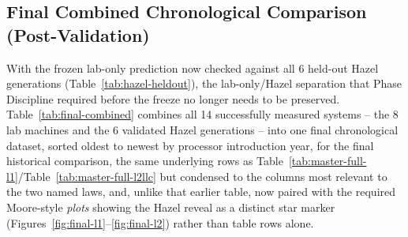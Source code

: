 \documentclass{article}
\begin{document}
\subsection{Final Combined Chronological Comparison (Post-Validation)}
\label{sec:final-combined}

With the frozen lab-only prediction now checked against all 6 held-out Hazel generations
(Table~\ref{tab:hazel-heldout}), the lab-only/Hazel separation that Phase Discipline required
before the freeze no longer needs to be preserved. Table~\ref{tab:final-combined} combines all
14 successfully measured systems -- the 8 lab machines and the 6 validated Hazel generations --
into one final chronological dataset, sorted oldest to newest by processor introduction year,
for the final historical comparison, the same underlying rows as
Table~\ref{tab:master-full-l1}/Table~\ref{tab:master-full-l2llc} but condensed to the columns
most relevant to the two named laws, and, unlike that earlier table, now paired with the
required Moore-style \emph{plots} showing the Hazel reveal as a distinct star marker
(Figures~\ref{fig:final-l1}--\ref{fig:final-l2}) rather than table rows alone.
\end{document}
